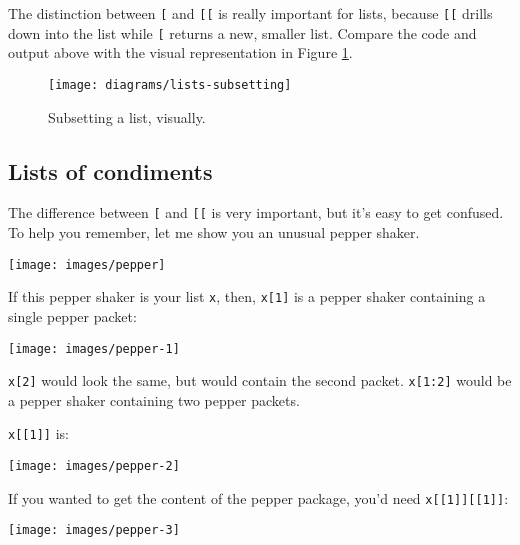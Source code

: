 \documentclass[]{book}
\begin{document}
The distinction between \texttt{{[}} and \texttt{{[}{[}} is really
important for lists, because \texttt{{[}{[}} drills down into the list
while \texttt{{[}} returns a new, smaller list. Compare the code and
output above with the visual representation in Figure
\ref{fig:lists-subsetting}.

\begin{figure}

{\centering \texttt{[image: diagrams/lists-subsetting]} 

}

\caption{Subsetting a list, visually.}\label{fig:lists-subsetting}
\end{figure}

\subsection{Lists of condiments}\label{lists-of-condiments}

The difference between \texttt{{[}} and \texttt{{[}{[}} is very
important, but it's easy to get confused. To help you remember, let me
show you an unusual pepper shaker.

\begin{center}\texttt{[image: images/pepper]} \end{center}

If this pepper shaker is your list \texttt{x}, then, \texttt{x{[}1{]}}
is a pepper shaker containing a single pepper packet:

\begin{center}\texttt{[image: images/pepper-1]} \end{center}

\texttt{x{[}2{]}} would look the same, but would contain the second
packet. \texttt{x{[}1:2{]}} would be a pepper shaker containing two
pepper packets.

\texttt{x{[}{[}1{]}{]}} is:

\begin{center}\texttt{[image: images/pepper-2]} \end{center}

If you wanted to get the content of the pepper package, you'd need
\texttt{x{[}{[}1{]}{]}{[}{[}1{]}{]}}:

\begin{center}\texttt{[image: images/pepper-3]} \end{center}
\end{document}
